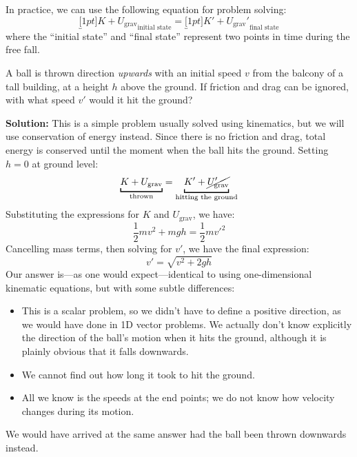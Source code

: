 In practice, we can use the following equation for problem solving:
\begin{equation}
  \underbracket[1pt]{K+U_\text{grav}}_\text{initial state}
  =\underbracket[1pt]{K'+U_\text{grav}'}_\text{final state}
\end{equation}
where the ``initial state'' and ``final state'' represent two points in time
during the free fall.

\begin{example}
  \label{eg:1d-freefall}
  A ball is thrown direction \emph{upwards} with an initial speed $v$ from the
  balcony of a tall building, at a height $h$ above the ground. If friction and
  drag can be ignored, with what speed $v'$ would it hit the ground?
  
  \textbf{Solution:} This is a simple problem usually solved using kinematics,
  but we will use conservation of energy instead. Since there is no friction
  and drag, total energy is conserved until the moment when the ball hits the
  ground. Setting $h=0$ at ground level:
  \begin{displaymath}
    \underbracket[1pt]{K + U_\text{grav}}_\text{thrown} =
    \underbracket[1pt]{K'+\cancel{U_\text{grav}'}}_\text{hitting the ground}
  \end{displaymath}
  Substituting the expressions for $K$ and $U_\text{grav}$, we have:
  \begin{displaymath}
    \frac12 mv^2 + mgh = \frac12 mv'^2
  \end{displaymath}
  Cancelling mass terms, then solving for $v'$, we have the final expression:
  \begin{displaymath}
    v'= \sqrt{v^2+2gh}
  \end{displaymath}
  Our answer is---as one would expect---identical to using one-dimensional
  kinematic equations, but with some subtle differences:
  \begin{itemize}[itemsep=6pt]
  \item This is a scalar problem, so we didn't have to define a positive
    direction, as we would have done in 1D vector problems. We actually
    don't know explicitly the direction of the ball's motion when it hits the
    ground, although it is plainly obvious that it falls downwards.
  \item We cannot find out how long it took to hit the ground.
  \item All we know is the speeds at the end points; we do not know how velocity
    changes during its motion.
  \end{itemize}
  We would have arrived at the same answer had the ball been thrown downwards
  instead.
\end{example}
